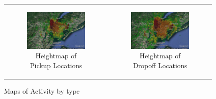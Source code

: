\documentclass{article}
\begin{document}
\begin{figure}
\begin{tabular}{cc}
\begin{subfigure}{.5\linewidth}
  \centering
  \includegraphics[width=.8\linewidth]{pickup_ne.jpg}
  \caption{Heightmap of Pickup Locations}
  \label{sub:pu_ne}%
\end{subfigure} &
\begin{subfigure}{.5\linewidth}
  \centering
  \includegraphics[width=.8\linewidth]{dropoff_ne.jpg}
  \caption{Heightmap of Dropoff Locations}
  \label{sub:do_ne}
\end{subfigure} \\ 

\end{tabular}
\label{fig:heatmap}
\caption{Maps of Activity by type}
\end{figure}

\vfill

\medskip


\end{document}
